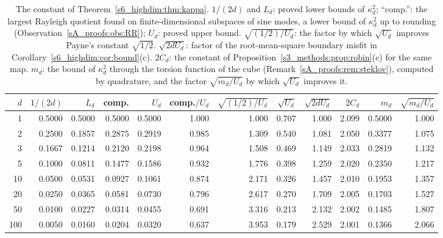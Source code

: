 \begin{table}[tbp]
\centering
\caption{The constant of Theorem~\ref{s6_highdim:thm:kappa}. $1/(2d)$ and $L_d$: proved lower
bounds of $\kappa_d^2$; ``comp.'': the largest Rayleigh quotient found on finite-dimensional
subspaces of sine modes, a lower bound of $\kappa_d^2$ up to rounding
(Observation~\ref{sA_proofs:obs:RR}); $U_d$: proved upper bound. $\sqrt{(1/2)/U_d}$: the factor by
which $\sqrt{U_d}$ improves Payne's constant $\sqrt{1/2}$. $\sqrt{2dU_d}$: factor of the
root-mean-square boundary misfit in Corollary~\ref{s6_highdim:cor:bound}(c). $2C_d$: the constant of
Proposition~\ref{s3_methods:prop:robin}(c) for the same map. $m_d$: the bound of $\kappa_d^2$ through
the torsion function of the cube (Remark~\ref{sA_proofs:rem:steklov}), computed by quadrature, and the
factor $\sqrt{m_d/U_d}$ by which $\sqrt{U_d}$ improves it.}
\label{s6_highdim:tab:kappa}
\footnotesize
\setlength{\tabcolsep}{3.8pt}
\begin{tabular}{@{}rrrrrrrrrrrr@{}}
\toprule
$d$ & $1/(2d)$ & $L_d$ & comp. & $U_d$ & comp.$/U_d$ & $\sqrt{(1/2)/U_d}$ & $\sqrt{U_d}$ & $\sqrt{2dU_d}$ & $2C_d$ & $m_d$ & $\sqrt{m_d/U_d}$\\
\midrule
1 & 0.5000 & 0.5000 & 0.5000 & 0.5000 & 1.000 & 1.000 & 0.707 & 1.000 & 2.099 & 0.5000 & 1.000 \\
2 & 0.2500 & 0.1857 & 0.2875 & 0.2919 & 0.985 & 1.309 & 0.540 & 1.081 & 2.050 & 0.3377 & 1.075 \\
3 & 0.1667 & 0.1214 & 0.2120 & 0.2198 & 0.964 & 1.508 & 0.469 & 1.149 & 2.033 & 0.2819 & 1.132 \\
5 & 0.1000 & 0.0811 & 0.1477 & 0.1586 & 0.932 & 1.776 & 0.398 & 1.259 & 2.020 & 0.2350 & 1.217 \\
10 & 0.0500 & 0.0531 & 0.0927 & 0.1061 & 0.874 & 2.171 & 0.326 & 1.457 & 2.010 & 0.1953 & 1.357 \\
20 & 0.0250 & 0.0365 & 0.0581 & 0.0730 & 0.796 & 2.617 & 0.270 & 1.709 & 2.005 & 0.1703 & 1.527 \\
50 & 0.0100 & 0.0227 & 0.0314 & 0.0455 & 0.691 & 3.316 & 0.213 & 2.132 & 2.002 & 0.1485 & 1.807 \\
100 & 0.0050 & 0.0160 & 0.0204 & 0.0320 & 0.637 & 3.953 & 0.179 & 2.529 & 2.001 & 0.1366 & 2.066 \\
\bottomrule
\end{tabular}
\end{table}


